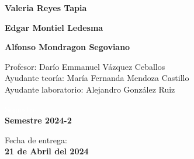\begin{titlepage}
    \vspace{5mm}
    
    \begin{minipage}{0.4\textwidth}
            \textbf{\Large{Valeria Reyes Tapia}}\\            
    \end{minipage}
    \begin{minipage}{0.4\textwidth}
        \begin{flushright}
            \textbf{\Large{Edgar Montiel Ledesma}}\\        
        \end{flushright}
    \end{minipage}
    
    \vspace{5mm}
    
    \begin{minipage}{0.8\textwidth}
        \begin{flushleft}
            \textbf{\Large{Alfonso Mondragon Segoviano}}\\            
        \end{flushleft}    
    \end{minipage}
    
    
    
    \vspace{20mm}
    
    \begin{minipage}{0.8\textwidth}
        \begin{flushleft} \large
            Profesor: Darío Emmanuel Vázquez Ceballos\\
            Ayudante teoría: María Fernanda Mendoza Castillo \\
            Ayudante laboratorio: Alejandro González Ruiz\\                    
        \end{flushleft}
    \end{minipage}
    
    \vspace{20mm}
    
    \begin{minipage}{0.4\textwidth}
        \textcolor{white}{Semestre}\\
        \large\textbf{Semestre 2024-2}      
    \end{minipage}
    \begin{minipage}{0.4\textwidth}
        \begin{flushright}
            {\large Fecha de entrega:\\
             \textbf{21 de Abril del 2024}}
        \end{flushright}
    \end{minipage}
    
    \makeatother
    
    \vfill 
    \end{titlepage}